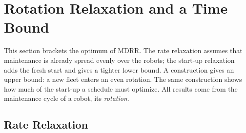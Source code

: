 \section{Rotation Relaxation and a Time Bound}
\label{sec:bounds}


This section brackets the optimum of MDRR.
The rate relaxation assumes that maintenance is already spread evenly over the robots; the start-up relaxation adds the fresh start and gives a tighter lower bound.
A construction gives an upper bound: a new fleet enters an even rotation.
The same construction shows how much of the start-up a schedule must optimize.
All results come from the maintenance cycle of a robot, its \emph{rotation}.

\subsection{Rate Relaxation}
\label{sec:bounds:rate}

